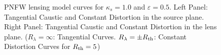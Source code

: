 \begin{figure}[!ht]
\caption{\label{pnfw_curves_pm-4} PNFW lensing model curves for $\kappa_s=1.0$
and $\varepsilon=0.5$. Left Panel: Tangential Caustic and Constant Distortion in
the source plane. Right Panel: Tangential Caustic and Constant Distortion in the
lens plane. ($R_\lambda=\infty$: Tangential Curves. $R_\lambda=\pm R_{\rm th}$:
Constant Distortion Curves for $R_{\rm th}=5$)}
\end{figure}


